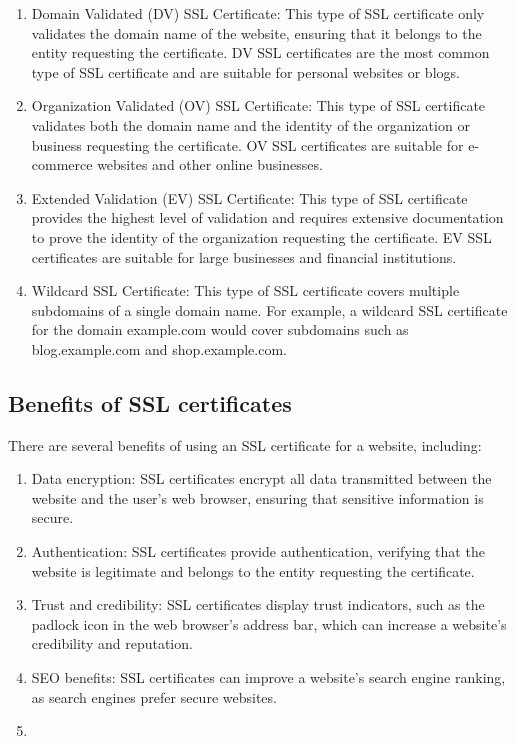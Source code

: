 \documentclass[11pt]{article}
\begin{document}
\begin{enumerate}
    \item Domain Validated (DV) SSL Certificate: This type of SSL certificate only validates the domain name of the website, ensuring that it belongs to the entity requesting the certificate. DV SSL certificates are the most common type of SSL certificate and are suitable for personal websites or blogs.
    \item Organization Validated (OV) SSL Certificate: This type of SSL certificate validates both the domain name and the identity of the organization or business requesting the certificate. OV SSL certificates are suitable for e-commerce websites and other online businesses.
    \item Extended Validation (EV) SSL Certificate: This type of SSL certificate provides the highest level of validation and requires extensive documentation to prove the identity of the organization requesting the certificate. EV SSL certificates are suitable for large businesses and financial institutions.
    \item Wildcard SSL Certificate: This type of SSL certificate covers multiple subdomains of a single domain name. For example, a wildcard SSL certificate for the domain example.com would cover subdomains such as blog.example.com and shop.example.com.
\end{enumerate}

\subsection{Benefits of SSL certificates}

There are several benefits of using an SSL certificate for a website, including:
\begin{enumerate}
    \item Data encryption: SSL certificates encrypt all data transmitted between the website and the user's web browser, ensuring that sensitive information is secure.
    \item Authentication: SSL certificates provide authentication, verifying that the website is legitimate and belongs to the entity requesting the certificate.
    \item Trust and credibility: SSL certificates display trust indicators, such as the padlock icon in the web browser's address bar, which can increase a website's credibility and reputation.
    \item SEO benefits: SSL certificates can improve a website's search engine ranking, as search engines prefer secure websites.
    \item

\end{enumerate}
\end{document}
